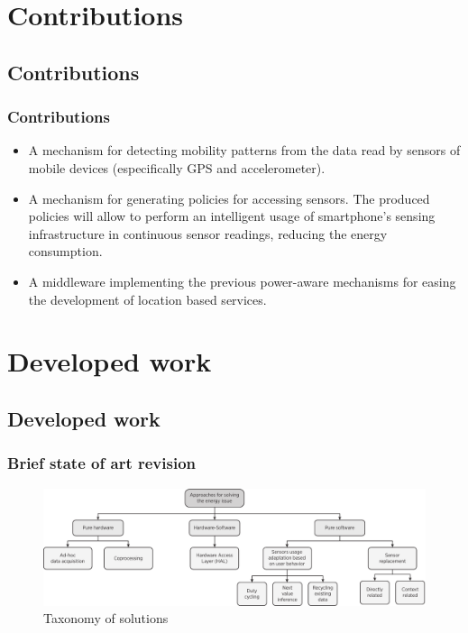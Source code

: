 \documentclass[compress,9pt,xcolor={dvipsnames,table}]{beamer}
\begin{document}
\section{Contributions}
\subsection{Contributions}
\begin{frame}\frametitle{Contributions}
\begin{itemize}
  \item A mechanism for detecting mobility patterns from the data read by sensors of mobile devices (especifically GPS and accelerometer).
  \item A mechanism for generating policies for accessing sensors.
  The produced policies will allow to perform an intelligent usage of smartphone's sensing infrastructure in continuous sensor readings, reducing the energy consumption.
  \item A middleware implementing the previous power-aware mechanisms for easing the development of location based services.
\end{itemize}
\end{frame}


\section{Developed work}
\subsection{Developed work}
\begin{frame}\frametitle{Brief state of art revision}
\begin{figure}[tb]
  \centering
  \includegraphics[width=\textwidth]{../../../resources/images/vectors/approaches-taxonomy}
  \caption{Taxonomy of solutions}
  \label{fig:taxonomy}
\end{figure}
\end{frame}
\end{document}
